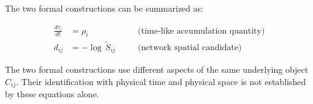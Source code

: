 The two formal constructions can be summarized as:

\begin{keybox}
\begin{align}
  \frac{d\tau_i}{dt} &= \rho_i
  \quad &&\text{(time-like accumulation quantity)}
  \label{eq:time_summary}\\[4pt]
  d_{ij} &= -\log\,\tilde{S}_{ij}
  \quad &&\text{(network spatial candidate)}
  \label{eq:space_summary}
\end{align}
\end{keybox}

\noindent
The two formal constructions use different aspects of the same underlying
object $C_{ij}$.  Their identification with physical time and physical space
is not established by these equations alone.
